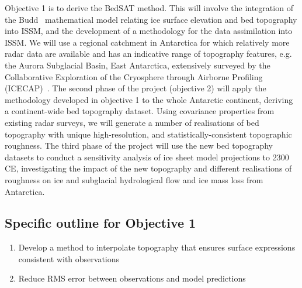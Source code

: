 Objective 1 is to derive the BedSAT method. This will involve the integration of the Budd~\cite{Budd_1970} mathematical model relating ice surface elevation and bed topography into ISSM, and the development of a methodology for the data assimilation into ISSM. We will use a regional catchment in Antarctica for which relatively more radar data are available and has an indicative range of topography features, e.g. the Aurora Subglacial Basin, East Antarctica, extensively surveyed by the Collaborative Exploration of the Cryosphere through Airborne Profiling (ICECAP)~\cite{Young_2011}. The second phase of the project (objective 2) will apply the methodology developed in objective 1 to the whole Antarctic continent, deriving a continent-wide bed topography dataset. Using covariance properties from existing radar surveys, we will generate a number of realisations of bed topography with unique high-resolution, and statistically-consistent topographic roughness. The third phase of the project will use the new bed topography datasets to conduct a sensitivity analysis of ice sheet model projections to 2300 CE, investigating the impact of the new topography and different realisations of roughness on ice and subglacial hydrological flow and ice mass loss from Antarctica.\\
\newpage
\subsection*{Specific outline for Objective 1}
\begin{enumerate}
\item Develop a method to interpolate topography that ensures surface expressions consistent with observations
\item Reduce RMS error between observations and model predictions
\end{enumerate}

